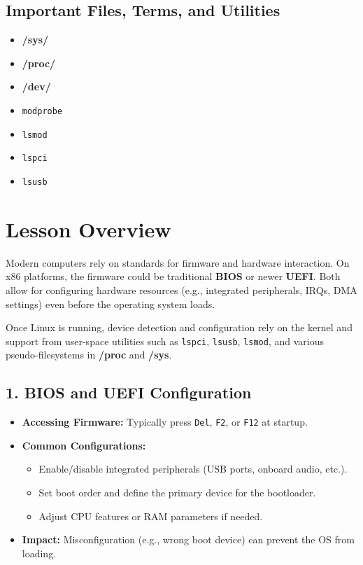 \documentclass[a4paper]{report}
\begin{document}
\subsection*{Important Files, Terms, and Utilities}
\begin{itemize}
    \item \textbf{/sys/}
    \item \textbf{/proc/}
    \item \textbf{/dev/}
    \item \texttt{modprobe}
    \item \texttt{lsmod}
    \item \texttt{lspci}
    \item \texttt{lsusb}
\end{itemize}

\section*{Lesson Overview}

Modern computers rely on standards for firmware and hardware interaction. On x86 platforms, the firmware could be traditional \textbf{BIOS} or newer \textbf{UEFI}. Both allow for configuring hardware resources (e.g., integrated peripherals, IRQs, DMA settings) even before the operating system loads.

Once Linux is running, device detection and configuration rely on the kernel and support from user-space utilities such as \texttt{lspci}, \texttt{lsusb}, \texttt{lsmod}, and various pseudo-filesystems in \textbf{/proc} and \textbf{/sys}.

\subsection*{1. BIOS and UEFI Configuration}
\begin{itemize}
    \item \textbf{Accessing Firmware:} Typically press \texttt{Del}, \texttt{F2}, or \texttt{F12} at startup.
    \item \textbf{Common Configurations:}
    \begin{itemize}
        \item Enable/disable integrated peripherals (USB ports, onboard audio, etc.).
        \item Set boot order and define the primary device for the bootloader.
        \item Adjust CPU features or RAM parameters if needed.
    \end{itemize}
    \item \textbf{Impact:} Misconfiguration (e.g., wrong boot device) can prevent the OS from loading.
\end{itemize}
\end{document}

